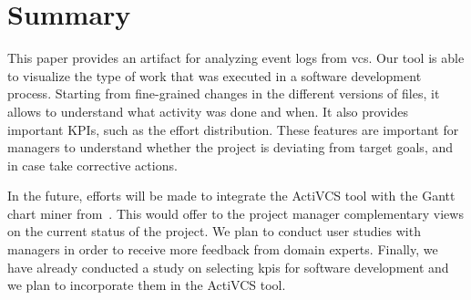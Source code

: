 \section{Summary}
\label{sec:conclusion}

This paper provides an artifact for analyzing event logs from \gls{vcs}. Our tool is able to visualize the type of work that was executed in a software development process. Starting from fine-grained changes in the different versions of files, it allows to understand what activity was done and when. It also provides important KPIs, such as the effort distribution. These features are important for managers to understand whether the project is deviating from target goals, and in case take corrective actions.

In the future, efforts will be made to integrate the ActiVCS tool with the Gantt chart miner from~\cite{DBLP:conf/bpm/BalaCMRP15}. This would offer to the project manager complementary views on the current status of the project. We plan to conduct user studies with managers in order to receive more feedback from domain experts. Finally, we have already conducted a study on selecting \glspl{kpi} for software development and we plan  to incorporate them in the ActiVCS tool.
